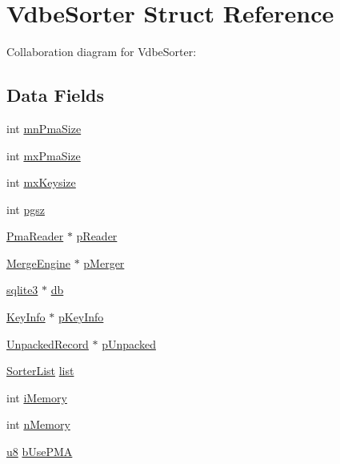 \hypertarget{struct_vdbe_sorter}{}\section{Vdbe\+Sorter Struct Reference}
\label{struct_vdbe_sorter}


Collaboration diagram for Vdbe\+Sorter\+:
\subsection*{Data Fields}
\begin{DoxyCompactItemize}
\item 
int \hyperlink{struct_vdbe_sorter_acc7b17ceec962249897b35cf74e32d12}{mn\+Pma\+Size}
\item 
int \hyperlink{struct_vdbe_sorter_a9a5eae87f8e640583165c77d5402113f}{mx\+Pma\+Size}
\item 
int \hyperlink{struct_vdbe_sorter_acedcae3c3e7ca617dac7746222492789}{mx\+Keysize}
\item 
int \hyperlink{struct_vdbe_sorter_a286de60ddf262ee4d36ee947f4ae00c9}{pgsz}
\item 
\hyperlink{struct_pma_reader}{Pma\+Reader} $\ast$ \hyperlink{struct_vdbe_sorter_a3313718acd02fe735e372faedbf6e369}{p\+Reader}
\item 
\hyperlink{struct_merge_engine}{Merge\+Engine} $\ast$ \hyperlink{struct_vdbe_sorter_ab9ebb5ec47cc445078cf9ffb98b9e66f}{p\+Merger}
\item 
\hyperlink{structsqlite3}{sqlite3} $\ast$ \hyperlink{struct_vdbe_sorter_ad6e663497d2c934364b3bcf07496b30b}{db}
\item 
\hyperlink{struct_key_info}{Key\+Info} $\ast$ \hyperlink{struct_vdbe_sorter_a2394c1e8402fe40753205256757b4165}{p\+Key\+Info}
\item 
\hyperlink{struct_unpacked_record}{Unpacked\+Record} $\ast$ \hyperlink{struct_vdbe_sorter_a3c35478dbef83c35370e3230491c4a87}{p\+Unpacked}
\item 
\hyperlink{struct_sorter_list}{Sorter\+List} \hyperlink{struct_vdbe_sorter_a0b728adf85f50e92f631147bac5f46ac}{list}
\item 
int \hyperlink{struct_vdbe_sorter_ab87539ef411d9bf1c22e417fbeddc961}{i\+Memory}
\item 
int \hyperlink{struct_vdbe_sorter_a54d2c7df7024509fff9a4b7a1d13742e}{n\+Memory}
\item 
\hyperlink{sqlite3_8c_a74a0f6424ae628af25f23f0a35f6ead3}{u8} \hyperlink{struct_vdbe_sorter_ab5160dba26e99bef22a9244cd277ffad}{b\+Use\+P\+M\+A}

\end{DoxyCompactItemize}
